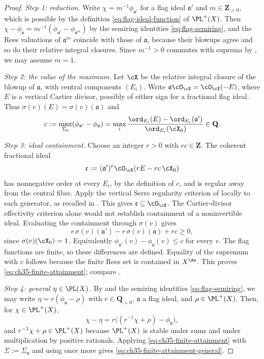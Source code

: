 \begin{proof}
\emph{Step 1: reduction.}  Write $\chi=m^{-1}\phi_{\mathfrak a'}$ for a
flag ideal $\mathfrak a'$ and $m\in\mathbf Z_{>0}$, which is possible by
the definition \eqref{eq:flag-ideal-function} of $\PL^+(X)$.  Then
$\chi-\phi_{\mathfrak a}=m^{-1}(\phi_{\mathfrak a'}-\phi_{\mathfrak a^m})$
by the semiring identities \eqref{eq:flag-semiring}, and the Rees valuations
of $\mathfrak a^m$ coincide with those of $\mathfrak a$, because their blowups agree and so do their relative integral closures.  Since
$m^{-1}>0$ commutes with suprema by
, we may assume $m=1$.

\emph{Step 2: the value of the maximum.} Let $\cX$ be the relative
integral closure of the blowup of $\mathfrak a$, with central components
$(E_i)$. Write $\mathfrak a\cO_{\cX}=\cO_{\cX}(-E)$, where $E$ is a
vertical Cartier divisor, possibly of either sign for a fractional flag
ideal. Thus $\sigma(v)(E)=\sigma(v)(\mathfrak a)$ and
\[
 c:=\max_{\Sigma_{\mathfrak a}}(\phi_{\mathfrak a'}-\phi_{\mathfrak a})
 =\max_i\frac{\ord_{E_i}(E)-\ord_{E_i}(\mathfrak a')}
                    {\ord_{E_i}(\cX_0)}\in\mathbf Q.
\]

\emph{Step 3: ideal containment.} Choose an integer $r>0$ with
$rc\in\mathbf Z$. The coherent fractional ideal
\[
 \mathfrak c:=(\mathfrak a')^r\cO_{\cX}(rE-rc\,\cX_0)
\]
has nonnegative order at every $E_i$, by the definition of $c$, and is
regular away from the central fibre. Apply the vertical Serre regularity
criterion of \cite[Lemma~1.23]{BJ22} locally to each generator, as recalled
in . This gives
$\mathfrak c\subseteq\cO_{\cX}$. The Cartier-divisor effectivity
criterion alone would not establish containment of a noninvertible ideal.
Evaluating the containment through $\sigma(v)$ gives
\[
 r\,\sigma(v)(\mathfrak a')-r\,\sigma(v)(\mathfrak a)+rc\geq0,
\]
since $\sigma(v)(\cX_0)=1$. Equivalently
$\phi_{\mathfrak a'}(v)-\phi_{\mathfrak a}(v)\leq c$ for every $v$.
The flag functions are finite, so these differences are defined.
Equality of the supremum with $c$ follows because the finite Rees set
is contained in $X^{\An}$. This proves
\eqref{eq:ch35-finite-attainment}; compare \cite[Lemma~2.13]{BJ22}.

\emph{Step 4: general $\eta\in\PL(X)$.}  By
 and the semiring identities
\eqref{eq:flag-semiring}, we may write
$\eta=r(\phi_{\mathfrak a}-\rho)$ with $r\in\mathbf Q_{>0}$,
$\mathfrak a$ a flag ideal, and $\rho\in\PL^+(X)$.  Then, for
$\chi\in\PL^+(X)$,
\[
 \chi-\eta=r\bigl((r^{-1}\chi+\rho)-\phi_{\mathfrak a}\bigr),
\]
and $r^{-1}\chi+\rho\in\PL^+(X)$ because $\PL^+(X)$ is stable under
sums and under multiplication by positive rationals.  Applying
\eqref{eq:ch35-finite-attainment} with $\Sigma:=\Sigma_{\mathfrak a}$ and
using  once more gives
\eqref{eq:ch35-finite-attainment-general}.
\end{proof}

